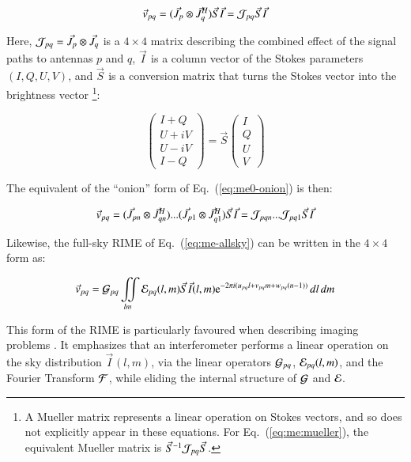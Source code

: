 \documentclass[referee]{aa}
\newcommand{\herm}{H}
\newcommand{\jones}[2]{\vec {#1}_{#2}}
\newcommand{\jonesinv}[2]{\vec {#1}^{-1}_{#2}}
\newcommand{\jonesT}[2]{\vec {#1}^{\herm}_{#2}}
\begin{document}
    \begin{equation}\label{eq:me:mueller}
    \vec v_{pq} = ( \jones{J}{p} \otimes \jonesT{J}{q} ) \jones{S}{} \jones{I}{} = {\cal J}_{pq} \jones{S}{} \jones{I}{}
    \end{equation}

Here, ${\cal J}_{pq}=\jones{J}{p} \otimes \jones{J}{q}$ is a $4\times4$ matrix describing the combined effect of the signal paths to antennas $p$ and $q$, $\jones{I}{}$ is a column vector of the Stokes parameters $(I,Q,U,V)$, and $\jones{S}{}$ is a conversion matrix that turns the Stokes vector into the brightness vector
\footnote{A Mueller matrix represents a linear operation on Stokes vectors, and so does not explicitly appear in these equations. For Eq.~(\ref{eq:me:mueller}), the equivalent Mueller matrix is  $\jonesinv{S}{}{\cal J}_{pq}\jones{S}{}$.}:


\[
\left ( \begin{array}{c}
I+Q \\ U+iV \\ U-iV \\ I-Q
\end{array} \right ) 
= \jones{S}{} 
\left ( \begin{array}{c}
I \\ Q \\ U \\ V
\end{array} \right ) 
\]

 
The equivalent of the ``onion'' form of Eq.~(\ref{eq:me0-onion}) is then:

    \begin{equation}\label{eq:me:mueller-onion}
    \vec v_{pq} = ( \jones{J}{pn} \otimes \jonesT{J}{qn} ) ... ( \jones{J}{p1} \otimes \jonesT{J}{q1} ) \jones{S}{} \jones{I}{}
= {\cal J}_{pqn} ...  {\cal J}_{pq1} \jones{S}{} \jones{I}{}
    \end{equation}


Likewise, the full-sky RIME of Eq.~(\ref{eq:me-allsky}) can be written in the $4\times4$ form as:

    \begin{equation}\label{eq:allsky:mueller}
\vec v_{pq} = {\cal G}_{pq} \iint\limits_{lm} {\cal E}_{pq}(l,m) \jones{S}{} \jones{I}{}(l,m) {\rm e}^{-2\pi i(u_{pq} l+v_{pq} m+w_{pq} (n-1))} \,dl\,dm 
    \end{equation}

This form of the RIME is particularly favoured when describing imaging problems \citep{SB:imageplane,Rau:DDEs}. It emphasizes that an interferometer performs a linear operation on the sky distribution $\jones{I}{}(l,m)$, via the linear operators ${\cal G}_{pq}$, ${\cal E}_{pq}(l,m)$, and the Fourier Transform $\cal F$, while eliding the internal structure of ${\cal G}$ and ${\cal E}$.
\end{document}

